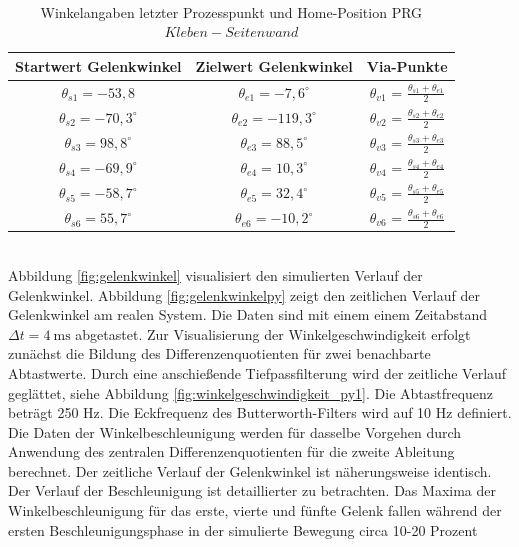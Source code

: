 \\
\begin{table}
\centering
\begin{tabular}{|c|c|c|}
	\hline
	Startwert Gelenkwinkel&  Zielwert Gelenkwinkel&  Via-Punkte\\
	\hline
	$\theta_{s1} = -53,8$&  $\theta_{e1} = -7,6^{\circ}$  &$\theta_{v1}$ = $\tfrac{\theta_{s1}+\theta_{e1}}{2}$  \\
	\hline
	$\theta_{s2} = -70,3^{\circ}$&  $\theta_{e2} = -119,3^{\circ}$    &$\theta_{v2}$ = $\tfrac{\theta_{s2}+\theta_{e2}}{2}$  \\
	\hline
	$\theta_{s3} = 98,8^{\circ}$&  $\theta_{e3} = 88,5^{\circ}$&$\theta_{v3}$ = $\tfrac{\theta_{s3}+\theta_{e3}}{2}$  \\
	\hline
	$\theta_{s4} = -69,9^{\circ}$&  $\theta_{e4} = 10,3^{\circ}$&$\theta_{v4}$ = $\tfrac{\theta_{s4}+\theta_{e4}}{2}$  \\
	\hline
	$\theta_{s5} = -58,7^{\circ}$&  $\theta_{e5} = 32,4^{\circ}$  &$\theta_{v5}$ = $\tfrac{\theta_{s5}+\theta_{e5}}{2}$  \\
	\hline
	$\theta_{s6} = 55,7^{\circ}$&  $\theta_{e6} = -10,2^{\circ}$&$\theta_{v6}$ = $\tfrac{\theta_{s6}+\theta_{e6}}{2}$  \\
	\hline
\end{tabular}
\caption{Winkelangaben letzter Prozesspunkt und Home-Position PRG $Kleben-Seitenwand$}
\label{tab:simu}
\end{table}
\\
Abbildung \ref{fig:gelenkwinkel}  visualisiert den simulierten  Verlauf der Gelenkwinkel. Abbildung \ref{fig:gelenkwinkelpy} zeigt den zeitlichen Verlauf der Gelenkwinkel am realen System. Die Daten sind mit einem einem  Zeitabstand $\Delta t = 4~\text{ms}$ abgetastet. Zur Visualisierung der Winkelgeschwindigkeit  erfolgt zunächst die Bildung des Differenzenquotienten für zwei benachbarte Abtastwerte. Durch eine anschießende Tiefpassfilterung wird der zeitliche Verlauf geglättet, siehe Abbildung \ref{fig:winkelgeschwindigkeit_py1}. Die Abtastfrequenz beträgt 250 Hz. Die Eckfrequenz des Butterworth-Filters wird auf 10 Hz definiert. Die Daten der Winkelbeschleunigung werden für dasselbe Vorgehen durch Anwendung des zentralen Differenzenquotienten für die zweite Ableitung berechnet. Der zeitliche Verlauf der Gelenkwinkel ist näherungsweise identisch. Der Verlauf der Beschleunigung ist detaillierter zu betrachten. Das Maxima der Winkelbeschleunigung für das erste, vierte und fünfte Gelenk  fallen während der ersten Beschleunigungsphase in der simulierte Bewegung circa 10-20 Prozent
